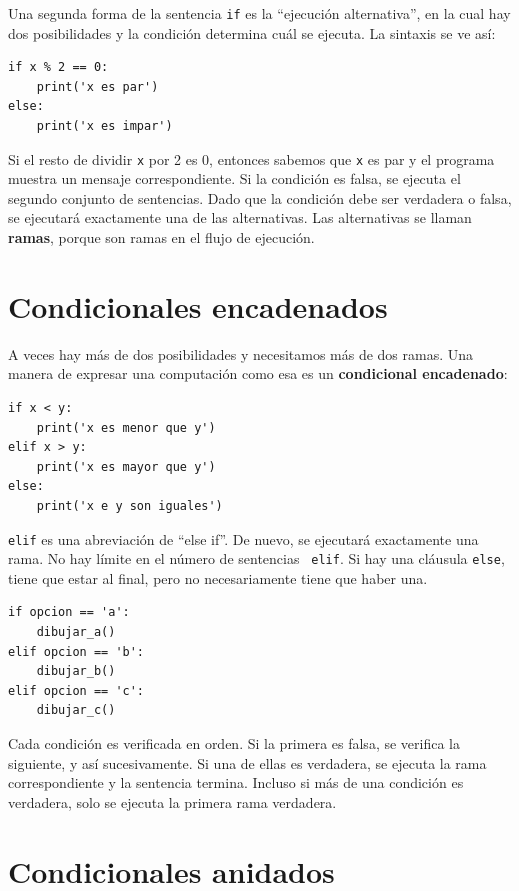 \documentclass[10pt]{book}
\begin{document}
Una segunda forma de la sentencia {\tt if} es la ``ejecución alternativa'',
en la cual hay dos posibilidades y la condición determina
cuál se ejecuta.  La sintaxis se ve así:

\begin{verbatim}
if x % 2 == 0:
    print('x es par')
else:
    print('x es impar')
\end{verbatim}
%
Si el resto de dividir {\tt x} por 2 es 0, entonces sabemos que
{\tt x} es par y el programa muestra un mensaje correspondiente.  Si
la condición es falsa, se ejecuta el segundo conjunto de sentencias.
Dado que la condición debe ser verdadera o falsa, se ejecutará exactamente
una de las alternativas.  Las alternativas se llaman {\bf
  ramas}, porque son ramas en el flujo de ejecución.



\section{Condicionales encadenados}

A veces hay más de dos posibilidades y necesitamos más de
dos ramas.  Una manera de expresar una computación como esa es un {\bf
condicional encadenado}:

\begin{verbatim}
if x < y:
    print('x es menor que y')
elif x > y:
    print('x es mayor que y')
else:
    print('x e y son iguales')
\end{verbatim}
%
{\tt elif} es una abreviación de ``else if''.  De nuevo, se ejecutará exactamente
una rama.  No hay límite en el número de sentencias {\tt
elif}.  Si hay una cláusula {\tt else}, tiene que estar
al final, pero no necesariamente tiene que haber una.

\begin{verbatim}
if opcion == 'a':
    dibujar_a()
elif opcion == 'b':
    dibujar_b()
elif opcion == 'c':
    dibujar_c()
\end{verbatim}
%
Cada condición es verificada en orden.  Si la primera es falsa,
se verifica la siguiente, y así sucesivamente.  Si una de ellas es
verdadera, se ejecuta la rama correspondiente y la sentencia
termina.  Incluso si más de una condición es verdadera, solo se ejecuta
la primera rama verdadera.


\section{Condicionales anidados}
\end{document}
